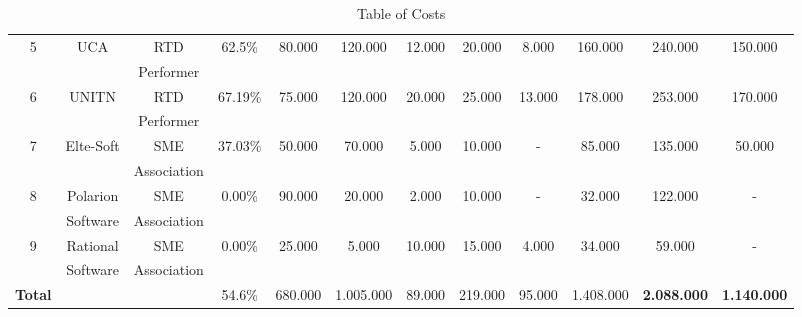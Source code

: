 \begin{table}[hbpt]
\begin{adjustbox}{width=1\textwidth}
\begin{tabular}{ |c|c|c|c|c|c|c|c|c|c|c|c|}
			5 & UCA & RTD & 62.5\% & 80.000 & 120.000 & 12.000 & 20.000 & 8.000 & 160.000 & 240.000 & 150.000 \\
			~ & ~ & Performer & ~ & ~ & ~ & ~ & ~ & ~ & ~ & ~ & \\
			\hline
			
			6 & UNITN & RTD & 67.19\% & 75.000 & 120.000 & 20.000 & 25.000 & 13.000 & 178.000 & 253.000 & 170.000 \\
			~ & ~ & Performer & ~ & ~ & ~ & ~ & ~ & ~ & ~ & ~ & \\
			\hline
			
			7 & Elte-Soft & SME & 37.03\% & 50.000 & 70.000 & 5.000 & 10.000 & - & 85.000 & 135.000 & 50.000 \\
			~ & ~ & Association & ~ & ~ & ~ & ~ & ~ & ~ & ~ & ~ & \\
			\hline
			
			8 & Polarion & SME & 0.00\% & 90.000 & 20.000 & 2.000 & 10.000 & - & 32.000 & 122.000 & - \\
			~ & Software & Association & ~ & ~ & ~ & ~ & ~ & ~ & ~ & ~ & \\
			\hline
			
			9 & Rational & SME & 0.00\% & 25.000 & 5.000 & 10.000 & 15.000 & 4.000 & 34.000 & 59.000 & - \\
			~ & Software & Association & ~ & ~ & ~ & ~ & ~ & ~ & ~ & ~ & \\
			\hline\hline\Large
			\textbf{Total} &  &  & 54.6\% & 680.000 & 1.005.000 & 89.000 & 219.000 & 95.000 & 1.408.000 &\Large\textbf{2.088.000} &\Large\textbf{1.140.000}
			\\\hline
		\end{tabular}
	\end{adjustbox}
\caption{Table of Costs}
\end{table}

